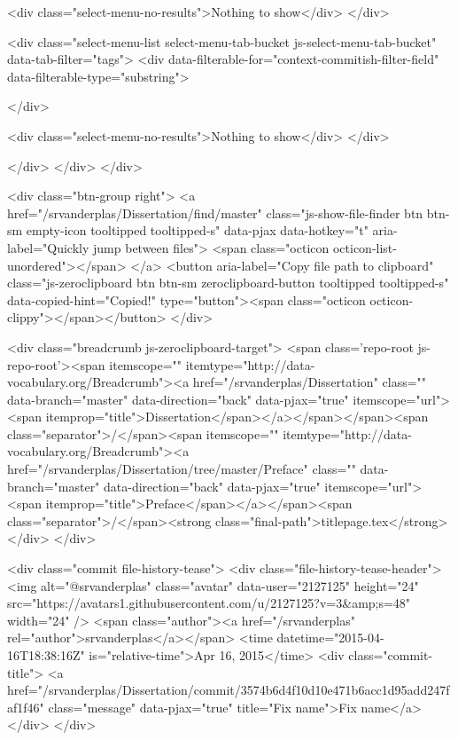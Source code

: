           <div class="select-menu-no-results">Nothing to show</div>
      </div>

      <div class="select-menu-list select-menu-tab-bucket js-select-menu-tab-bucket" data-tab-filter="tags">
        <div data-filterable-for="context-commitish-filter-field" data-filterable-type="substring">


        </div>

        <div class="select-menu-no-results">Nothing to show</div>
      </div>

    </div>
  </div>
</div>

  <div class="btn-group right">
    <a href="/srvanderplas/Dissertation/find/master"
          class="js-show-file-finder btn btn-sm empty-icon tooltipped tooltipped-s"
          data-pjax
          data-hotkey="t"
          aria-label="Quickly jump between files">
      <span class="octicon octicon-list-unordered"></span>
    </a>
    <button aria-label="Copy file path to clipboard" class="js-zeroclipboard btn btn-sm zeroclipboard-button tooltipped tooltipped-s" data-copied-hint="Copied!" type="button"><span class="octicon octicon-clippy"></span></button>
  </div>

  <div class="breadcrumb js-zeroclipboard-target">
    <span class='repo-root js-repo-root'><span itemscope="" itemtype="http://data-vocabulary.org/Breadcrumb"><a href="/srvanderplas/Dissertation" class="" data-branch="master" data-direction="back" data-pjax="true" itemscope="url"><span itemprop="title">Dissertation</span></a></span></span><span class="separator">/</span><span itemscope="" itemtype="http://data-vocabulary.org/Breadcrumb"><a href="/srvanderplas/Dissertation/tree/master/Preface" class="" data-branch="master" data-direction="back" data-pjax="true" itemscope="url"><span itemprop="title">Preface</span></a></span><span class="separator">/</span><strong class="final-path">titlepage.tex</strong>
  </div>
</div>


  <div class="commit file-history-tease">
    <div class="file-history-tease-header">
        <img alt="@srvanderplas" class="avatar" data-user="2127125" height="24" src="https://avatars1.githubusercontent.com/u/2127125?v=3&amp;s=48" width="24" />
        <span class="author"><a href="/srvanderplas" rel="author">srvanderplas</a></span>
        <time datetime="2015-04-16T18:38:16Z" is="relative-time">Apr 16, 2015</time>
        <div class="commit-title">
            <a href="/srvanderplas/Dissertation/commit/3574b6d4f10d10e471b6acc1d95add247faf1f46" class="message" data-pjax="true" title="Fix name">Fix name</a>
        </div>
    </div>

